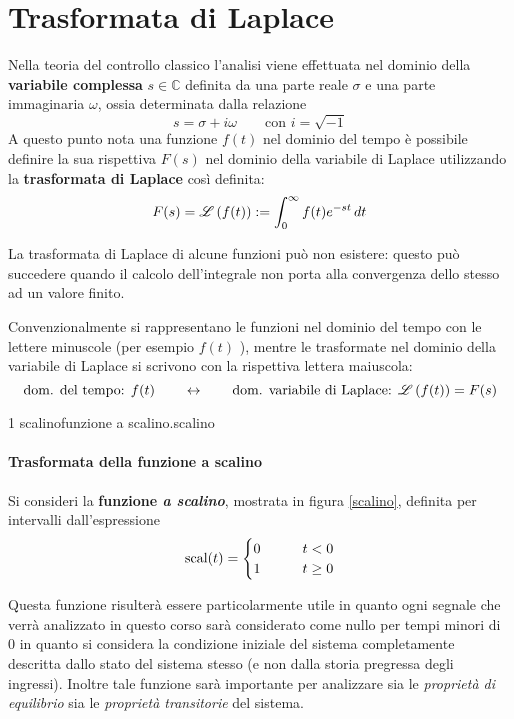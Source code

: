\section{Trasformata di Laplace}
	\begin{concetto}
		Nella teoria del controllo classico l'analisi viene effettuata nel dominio della \textbf{variabile complessa} $s \in \mathds C$ definita da una parte reale $\sigma$ e una parte immaginaria $\omega$, ossia determinata dalla relazione
		\[ s = \sigma + i \omega \qquad \textrm{con } i = \sqrt{-1} \]  
		A questo punto nota una funzione $f(t)$ nel dominio del tempo è possibile definire la sua rispettiva $F(s)$ nel dominio della variabile di Laplace utilizzando la \textbf{trasformata di Laplace} così definita:
		\begin{equation} \label{teoria:eq:trasformata}
			F(s) = \mathscr L \left( f(t) \right) := \int_0^\infty f(t) e^{-st} \, dt
		\end{equation}		
	\end{concetto}
	\begin{osservazione}
		La trasformata di Laplace di alcune funzioni può non esistere: questo può succedere quando il calcolo dell'integrale non porta alla convergenza dello stesso ad un valore finito.
	\end{osservazione}
	
	Convenzionalmente si rappresentano le funzioni nel dominio del tempo con le lettere minuscole (per esempio $f(t)$ ), mentre le trasformate nel dominio della variabile di Laplace si scrivono con la rispettiva lettera maiuscola:
	\[ \textrm{dom. del tempo: } f(t) \qquad \leftrightarrow \qquad \textrm{dom. variabile di Laplace: }\mathscr L \left( f(t) \right) =F(s)  \]
	
	 1 {scalino}{funzione a scalino.}{scalino}
	\paragraph{Trasformata della funzione a scalino} Si consideri la \textbf{funzione \textit{a scalino}}, mostrata in figura \ref{scalino}, definita per intervalli dall'espressione
	\begin{equation}
	    \textrm{scal}(t)= \begin{cases} 0 \qquad & t < 0 \\ 1 \qquad & t \geq 0 \end{cases} 
	\end{equation}
    
    Questa funzione risulterà essere particolarmente utile in quanto ogni segnale che verrà analizzato in questo corso sarà considerato come nullo per tempi minori di 0 in quanto si considera la condizione iniziale del sistema completamente descritta dallo stato del sistema stesso (e non dalla storia pregressa degli ingressi). Inoltre tale funzione sarà importante per analizzare sia le \textit{proprietà di equilibrio} sia le \textit{proprietà transitorie} del sistema.
    
